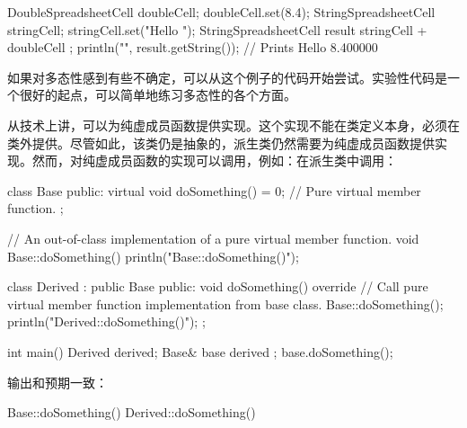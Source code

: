 \begin{cpp}
DoubleSpreadsheetCell doubleCell; doubleCell.set(8.4);
StringSpreadsheetCell stringCell; stringCell.set("Hello ");
StringSpreadsheetCell result { stringCell + doubleCell };
println("{}", result.getString()); // Prints Hello 8.400000
\end{cpp}

如果对多态性感到有些不确定，可以从这个例子的代码开始尝试。实验性代码是一个很好的起点，可以简单地练习多态性的各个方面。


从技术上讲，可以为纯虚成员函数提供实现。这个实现不能在类定义本身，必须在类外提供。尽管如此，该类仍是抽象的，派生类仍然需要为纯虚成员函数提供实现。然而，对纯虚成员函数的实现可以调用，例如：在派生类中调用：

\begin{cpp}
class Base
{
    public:
        virtual void doSomething() = 0; // Pure virtual member function.
};

// An out-of-class implementation of a pure virtual member function.
void Base::doSomething() { println("Base::doSomething()"); }

class Derived : public Base
{
    public:
        void doSomething() override
        {
            // Call pure virtual member function implementation from base class.
            Base::doSomething();
            println("Derived::doSomething()");
        }
};

int main()
{
    Derived derived;
    Base& base { derived };
    base.doSomething();
}
\end{cpp}

输出和预期一致：

\begin{shell}
Base::doSomething()
Derived::doSomething()
\end{shell}





